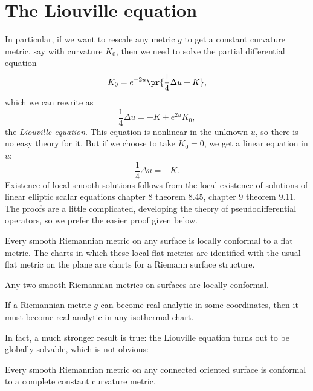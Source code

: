 \section{The Liouville equation}
In particular, if we want to rescale any metric \(g\) to get a constant curvature metric, say with curvature \(K_0\), then we need to solve the partial differential equation
\[
K_0 = e^{-2u}\pr{\frac{1}{4} \Delta u + K},
\]
which we can rewrite as
\[
\frac{1}{4} \Delta u  = -K  + e^{2u}K_0,
\]
the \emph{Liouville equation}.
This equation is nonlinear in the unknown \(u\), so there is no easy theory for it.
But if we choose to take \(K_0=0\), we get a linear equation in \(u\):
\[
\frac{1}{4} \Delta u  = -K.
\]
Existence of local smooth solutions follows from the local existence of solutions of linear elliptic scalar equations \cite{Folland:1995} chapter 8 theorem 8.45, \cite{McKay:2018b} chapter 9 theorem 9.11.
The proofs are a little complicated, developing the theory of pseudodifferential operators, so we prefer the easier proof given below.
\begin{theorem}
Every smooth Riemannian metric on any surface is locally conformal to a flat metric.
The charts in which these local flat metrics are identified with the usual flat metric on the plane are charts for a Riemann surface structure.
\end{theorem}
\begin{corollary}
Any two smooth Riemannian metrics on surfaces are locally conformal.
\end{corollary}
\begin{corollary}
If a Riemannian metric \(g\) can become real analytic in some coordinates, then it must become real analytic in any isothermal chart.
\end{corollary}

In fact, a much stronger result is true: the Liouville equation turns out to be globally solvable, which is not obvious:

\begin{theorem}
Every smooth Riemannian metric on any connected oriented surface is conformal to a complete constant curvature metric.
\end{theorem}

